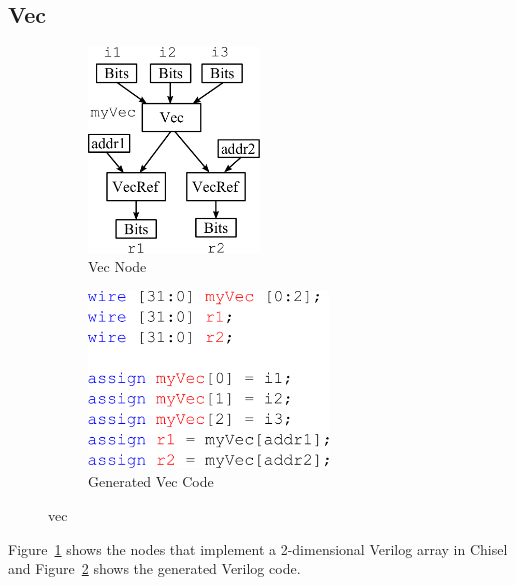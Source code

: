 \subsection{Vec}
\begin{figure}[hb]
\centering
  \begin{subfigure}[t]{0.48\textwidth}
  \centering
  \includegraphics[width=0.5\textwidth]{figures/vecnode.pdf}
  \caption{Vec Node}
  \label{fig:vecnode}
  \end{subfigure}
  \hfill
  \begin{subfigure}[t]{0.48\textwidth}
  \centering
  \includegraphics[width=0.7\textwidth]{figures/vecv.pdf}
  \caption{Generated Vec Code}
  \label{fig:vecv}
  \end{subfigure}
\caption{vec}
\label{fig:vec}
\end{figure}

Figure~\ref{fig:vecnode} shows the nodes that implement a
2-dimensional Verilog array in Chisel and Figure~\ref{fig:vecv} shows
the generated Verilog code.

